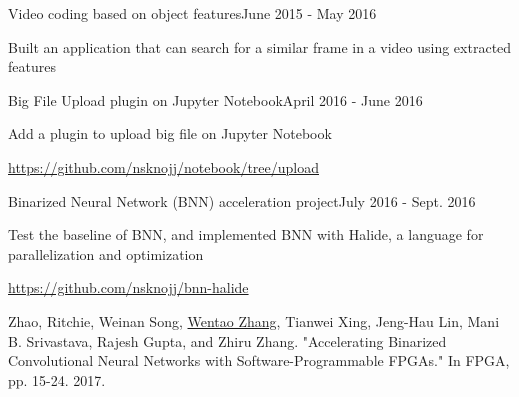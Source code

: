 \documentclass{joel_cv}
\begin{document}
\begin{sectionContentSimple}{Video coding based on object features}{June 2015 - May 2016}
\item Built an application that can search for a similar frame in a video using extracted features
\end{sectionContentSimple}

\begin{sectionContentSimple}{Big File Upload plugin on Jupyter Notebook}{April 2016 - June 2016}
\item Add a plugin to upload big file on Jupyter Notebook
\item \url{https://github.com/nsknojj/notebook/tree/upload}
\end{sectionContentSimple}

\begin{sectionContentSimple}{Binarized Neural Network (BNN) acceleration project}{July 2016 - Sept. 2016}
\item Test the baseline of BNN, and implemented BNN with Halide, a language for parallelization and optimization
\item \url{https://github.com/nsknojj/bnn-halide}
\end{sectionContentSimple}


%
%


%
%

\begin{sectionContentNaive}

\item Zhao, Ritchie, Weinan Song, \underline{Wentao Zhang}, Tianwei Xing, Jeng-Hau Lin, Mani B. Srivastava, Rajesh Gupta, and Zhiru Zhang. "Accelerating Binarized Convolutional Neural Networks with Software-Programmable FPGAs." In FPGA, pp. 15-24. 2017.

\end{sectionContentNaive}



\end{document}
